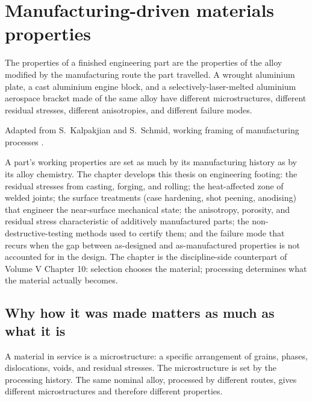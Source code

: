 \chapter{Manufacturing-driven materials properties}
\label{vol05:ch11}

\epigraph{The properties of a finished engineering part are the
properties of the alloy modified by the manufacturing route the part
travelled. A wrought aluminium plate, a cast aluminium engine block,
and a selectively-laser-melted aluminium aerospace bracket made of
the same alloy have different microstructures, different residual
stresses, different anisotropies, and different failure modes.}{Adapted
from S.\ Kalpakjian and S.\ Schmid, working framing of manufacturing
processes \cite[ch.~1, pp.~1--12]{text:kalpakjian-manufacturing}.}


\noindent
A part's working properties are set as much by its manufacturing
history as by its alloy chemistry. The chapter develops this thesis on
engineering footing: the residual stresses from casting, forging, and
rolling; the heat-affected zone of welded joints; the surface
treatments (case hardening, shot peening, anodising) that engineer the
near-surface mechanical state; the anisotropy, porosity, and residual
stress characteristic of additively manufactured parts; the
non-destructive-testing methods used to certify them; and the failure
mode that recurs when the gap between as-designed and as-manufactured
properties is not accounted for in the design. The chapter is the
discipline-side counterpart of Volume V Chapter 10: selection chooses
the material; processing determines what the material actually
becomes.

\section{Why how it was made matters as much as what it is}

A material in service is a microstructure: a specific arrangement of
grains, phases, dislocations, voids, and residual stresses. The
microstructure is set by the processing history. The same nominal
alloy, processed by different routes, gives different microstructures
and therefore different properties.

